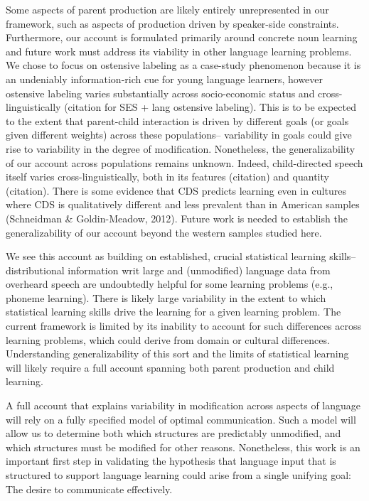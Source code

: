 \documentclass[english,,man,floatsintext]{apa6}
\begin{document}
Some aspects of parent production are likely entirely unrepresented in our framework, such as aspects of production driven by speaker-side constraints. Furthermore, our account is formulated primarily around concrete noun learning and future work must address its viability in other language learning problems. We chose to focus on ostensive labeling as a case-study phenomenon because it is an undeniably information-rich cue for young language learners, however ostensive labeling varies substantially across socio-economic status and cross-linguistically (citation for SES + lang ostensive labeling). This is to be expected to the extent that parent-child interaction is driven by different goals (or goals given different weights) across these populations-- variability in goals could give rise to variability in the degree of modification. Nonetheless, the generalizability of our account across populations remains unknown. Indeed, child-directed speech itself varies cross-linguistically, both in its features (citation) and quantity (citation). There is some evidence that CDS predicts learning even in cultures where CDS is qualitatively different and less prevalent than in American samples (Schneidman \& Goldin-Meadow, 2012). Future work is needed to establish the generalizability of our account beyond the western samples studied here.

We see this account as building on established, crucial statistical learning skills-- distributional information writ large and (unmodified) language data from overheard speech are undoubtedly helpful for some learning problems (e.g., phoneme learning). There is likely large variability in the extent to which statistical learning skills drive the learning for a given learning problem. The current framework is limited by its inability to account for such differences across learning problems, which could derive from domain or cultural differences. Understanding generalizability of this sort and the limits of statistical learning will likely require a full account spanning both parent production and child learning.

A full account that explains variability in modification across aspects of language will rely on a fully specified model of optimal communication. Such a model will allow us to determine both which structures are predictably unmodified, and which structures must be modified for other reasons. Nonetheless, this work is an important first step in validating the hypothesis that language input that is structured to support language learning could arise from a single unifying goal: The desire to communicate effectively.
\end{document}
